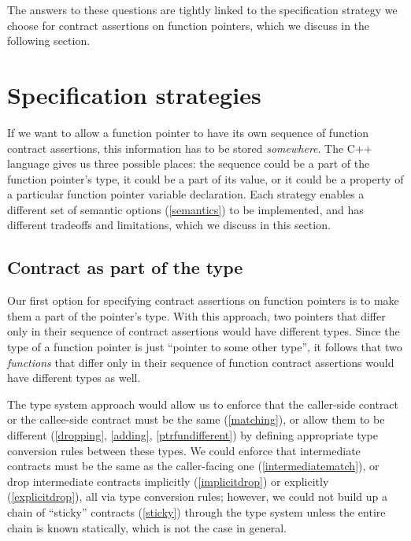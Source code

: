 The answers to these questions are tightly linked to the specification strategy we choose for contract assertions on function pointers, which we discuss in the following section.

\section{Specification strategies}
\label{wherelive}


If we want to allow a function pointer to have its own sequence of function contract assertions, this information has to be stored \emph{somewhere}. The C++ language gives us three possible places: the sequence could be a part of the function pointer's type, it could be a part of its value, or it could be a property of a particular function pointer variable declaration. Each strategy enables a different set of semantic options (\ref{semantics}) to be implemented, and has different tradeoffs and limitations, which we discuss in this section.

\subsection{Contract as part of the type}
\label{type}

Our first option for specifying contract assertions on function pointers is to make them a part of the pointer's type. With this approach, two pointers that differ only in their sequence of contract assertions would have different types. Since the type of a function pointer is just ``pointer to some other type'', it follows that two \emph{functions} that differ only in their sequence of function contract assertions would have different types as well.

The type system approach would allow us to enforce that the caller-side contract or the callee-side contract must be the same (\ref{matching}), or allow them to be different (\ref{dropping}, \ref{adding}, \ref{ptrfundifferent}) by defining appropriate type conversion rules between these types. We could enforce that intermediate contracts must be the same as the caller-facing one (\ref{intermediatematch}), or drop intermediate contracts implicitly (\ref{implicitdrop}) or explicitly (\ref{explicitdrop}), all via type conversion rules; however, we could not build up a chain of ``sticky'' contracts (\ref{sticky}) through the type system unless the entire chain is known statically, which is not the case in general. 

